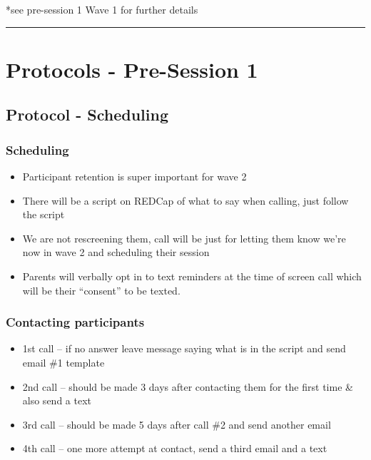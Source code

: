 \documentclass[]{book}
\providecommand{\tightlist}{%
  \setlength{\itemsep}{0pt}\setlength{\parskip}{0pt}}
\begin{document}
*see pre-session 1 Wave 1 for further details

\begin{center}\rule{0.5\linewidth}{0.5pt}\end{center}

\hypertarget{protocols---pre-session-1-2}{%
\section{Protocols - Pre-Session 1}\label{protocols---pre-session-1-2}}

\hypertarget{protocol---scheduling-1}{%
\subsection{Protocol - Scheduling}\label{protocol---scheduling-1}}

\hypertarget{scheduling-2}{%
\subsubsection{Scheduling}\label{scheduling-2}}

\begin{itemize}
\tightlist
\item
  Participant retention is super important for wave 2
\item
  There will be a script on REDCap of what to say when calling, just follow the script
\item
  We are not rescreening them, call will be just for letting them know we're now in wave 2 and scheduling their session
\item
  Parents will verbally opt in to text reminders at the time of screen call which will be their ``consent'' to be texted.
\end{itemize}

\hypertarget{contacting-participants-1}{%
\subsubsection{Contacting participants}\label{contacting-participants-1}}

\begin{itemize}
\tightlist
\item
  1st call -- if no answer leave message saying what is in the script and send email \#1 template
\item
  2nd call -- should be made 3 days after contacting them for the first time \& also send a text
\item
  3rd call -- should be made 5 days after call \#2 and send another email
\item
  4th call -- one more attempt at contact, send a third email and a text
\end{itemize}
\end{document}
